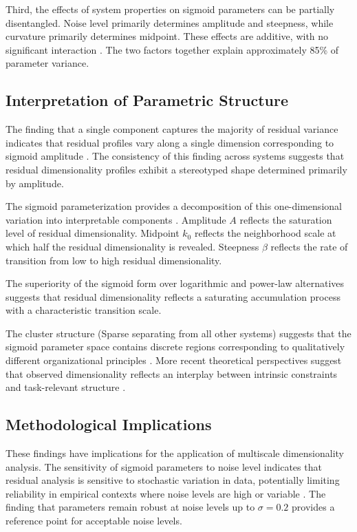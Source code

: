 \documentclass[11pt]{article}
\begin{document}
Third, the effects of system properties on sigmoid parameters can be partially disentangled. Noise level primarily determines amplitude and steepness, while curvature primarily determines midpoint. These effects are additive, with no significant interaction \citep{ward1963hierarchical}. The two factors together explain approximately 85\% of parameter variance.

\subsection{Interpretation of Parametric Structure}

The finding that a single component captures the majority of residual variance indicates that residual profiles vary along a single dimension corresponding to sigmoid amplitude \citep{stringer2019high}. The consistency of this finding across systems suggests that residual dimensionality profiles exhibit a stereotyped shape determined primarily by amplitude.

The sigmoid parameterization provides a decomposition of this one-dimensional variation into interpretable components \citep{hotz2023intrinsic}. Amplitude $A$ reflects the saturation level of residual dimensionality. Midpoint $k_0$ reflects the neighborhood scale at which half the residual dimensionality is revealed. Steepness $\beta$ reflects the rate of transition from low to high residual dimensionality.

The superiority of the sigmoid form over logarithmic and power-law alternatives suggests that residual dimensionality reflects a saturating accumulation process with a characteristic transition scale.

The cluster structure (Sparse separating from all other systems) suggests that the sigmoid parameter space contains discrete regions corresponding to qualitatively different organizational principles \citep{gallego2017neural}. More recent theoretical perspectives suggest that observed dimensionality reflects an interplay between intrinsic constraints and task-relevant structure \citep{saxe2021if}.

\subsection{Methodological Implications}

These findings have implications for the application of multiscale dimensionality analysis. The sensitivity of sigmoid parameters to noise level indicates that residual analysis is sensitive to stochastic variation in data, potentially limiting reliability in empirical contexts where noise levels are high or variable \citep{coifman2006diffusion}. The finding that parameters remain robust at noise levels up to $\sigma = 0.2$ provides a reference point for acceptable noise levels.
\end{document}

